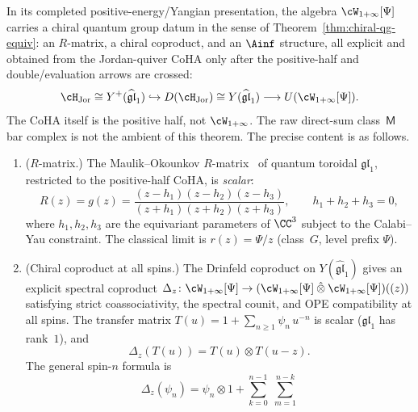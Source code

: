 \begin{theorem}
\label{thm:w-infty-chiral-qg}
\ClaimStatusConditional
In its completed positive-energy/Yangian presentation, the algebra
$\cW_{1+\infty}[\Psi]$ carries a chiral quantum group datum in the sense of
Theorem~\textup{\ref{thm:chiral-qg-equiv}}: an $R$-matrix,
a chiral coproduct, and an $\Ainf$ structure, all explicit
and obtained from the Jordan-quiver CoHA only after the positive-half
and double/evaluation arrows are crossed:
\[
\cH_{\mathrm{Jor}}\cong Y^+(\widehat{\mathfrak{gl}}_1)
\hookrightarrow
D(\cH_{\mathrm{Jor}})\cong Y(\widehat{\mathfrak{gl}}_1)
\longrightarrow U(\cW_{1+\infty}[\Psi]).
\]
The CoHA itself is the positive half, not
\(\cW_{1+\infty}\). The raw direct-sum class~$\mathsf M$
bar complex is not the ambient of this theorem. The precise content is as follows.
\begin{enumerate}[label=\textup{(\Roman*)}]
\item \textup{($R$-matrix.)}
 The Maulik--Okounkov $R$-matrix~\cite{MO19} of quantum
 toroidal $\mathfrak{gl}_1$, restricted to the positive-half CoHA, is
 \emph{scalar}:
 \begin{equation}\label{eq:gl1-scalar-r}
 R(z) = g(z)
 = \frac{(z - h_1)(z - h_2)(z - h_3)}
 {(z + h_1)(z + h_2)(z + h_3)},
 \qquad h_1 + h_2 + h_3 = 0,
 \end{equation}
 where $h_1, h_2, h_3$ are the equivariant parameters of
 $\CC^3$ subject to the Calabi--Yau constraint. The
 classical limit is
 $r(z) = \Psi/z$ \textup{(}class~$G$, level prefix
 $\Psi$\textup{)}.
\item \textup{(Chiral coproduct at all spins.)}
 The Drinfeld coproduct on $Y(\widehat{\mathfrak{gl}}_1)$
 gives an explicit spectral coproduct
 $\Delta_z \colon \cW_{1+\infty}[\Psi] \to
 (\cW_{1+\infty}[\Psi] \mathbin{\hat{\otimes}}
 \cW_{1+\infty}[\Psi])((z))$
 satisfying strict coassociativity,
 the spectral counit, and OPE compatibility at all spins.
 The transfer matrix
 $T(u) = 1 + \sum_{n \geq 1} \psi_n\, u^{-n}$
 is scalar \textup{(}$\mathfrak{gl}_1$ has
 rank~$1$\textup{)}, and
 \begin{equation}\label{eq:gl1-drinfeld-coprod}
 \Delta_z(T(u))
 = T(u) \otimes T(u - z).
 \end{equation}
 The general spin-$n$ formula is
 \begin{equation}\label{eq:gl1-coprod-general}
 \Delta_z(\psi_n)
 = \psi_n \otimes 1
 + \sum_{k=0}^{n-1}\; \sum_{m=1}^{n-k}

\end{equation}
\end{enumerate}
\end{theorem}
